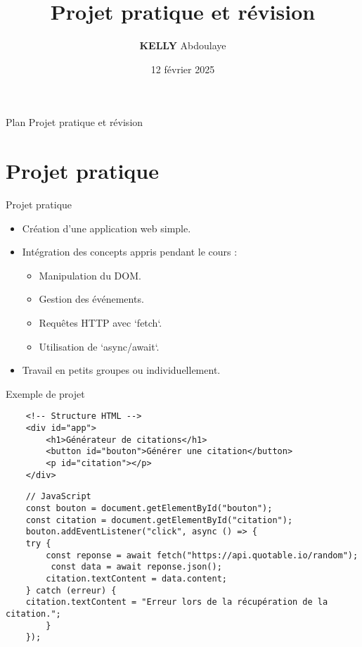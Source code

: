 \documentclass{beamer}
\title{Projet pratique et révision}
\institute{Mali\_Code}
\date{12 février 2025}
\author{ \textbf{KELLY} Abdoulaye}
\begin{document}
\begin{frame}
    \titlepage
    \end{frame}
    
    \begin{frame}{Plan Projet pratique et révision}
    \tableofcontents
    \end{frame}
    
    \section{Projet pratique}
    \begin{frame}{Projet pratique}
    \begin{itemize}
        \item Création d'une application web simple.
        \item Intégration des concepts appris pendant le cours :
            \begin{itemize}
                \item Manipulation du DOM.
                \item Gestion des événements.
                \item Requêtes HTTP avec `fetch`.
                \item Utilisation de `async/await`.
            \end{itemize}
        \item Travail en petits groupes ou individuellement.
    \end{itemize}
    \end{frame}
    
    \begin{frame}[fragile]{Exemple de projet}
    \begin{verbatim}
    <!-- Structure HTML -->
    <div id="app">
        <h1>Générateur de citations</h1>
        <button id="bouton">Générer une citation</button>
        <p id="citation"></p>
    </div>
    \end{verbatim}
    
    \begin{verbatim}
    // JavaScript
    const bouton = document.getElementById("bouton");
    const citation = document.getElementById("citation");
    bouton.addEventListener("click", async () => {
    try {
        const reponse = await fetch("https://api.quotable.io/random");
         const data = await reponse.json();
        citation.textContent = data.content;
    } catch (erreur) {
    citation.textContent = "Erreur lors de la récupération de la citation.";
        }
    });
    \end{verbatim}
    \end{frame}
    
\end{document}
